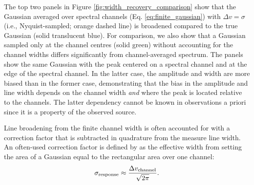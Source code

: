 \documentclass{rnaastex}
\begin{document}
The top two panels in Figure \ref{fig:width_recovery_comparison} show that the Gaussian averaged over spectral channels (Eq. \ref{eq:finite_gaussian}) with $\Delta v = \sigma$ (i.e., Nyquist-sampled; orange dashed line) is broadened compared to the true Gaussian (solid translucent blue).  For comparison, we also show that a Gaussian sampled only at the channel centres (solid green) without accounting for the channel widths differs significantly from channel-averaged spectrum.  The panels show the same Gaussian with the peak centered on a spectral channel and at the edge of the spectral channel.  In the latter case, the amplitude and width are more biased than in the former case, demonstrating that the bias in the amplitude and line width depends on the channel width {\it and} where the peak is located relative to the channels.  The latter dependency cannot be known in observations a priori since it is a property of the observed source.

Line broadening from the finite channel width is often accounted for with a correction factor that is subtracted in quadrature from the measure line width.  An often-used correction factor is defined by \citet{cprops} as the effective width from setting the area of a Gaussian equal to the rectangular area over one channel:
\begin{equation}
    \label{eq:width_corr_fact}
    \sigma_{\rm response} \approx \frac{\Delta v_{\rm channel}}{\sqrt{2\pi}}.
\end{equation}

\end{document}
